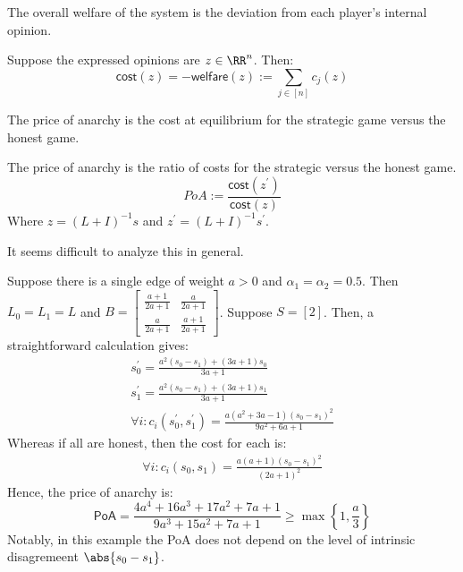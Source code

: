 The overall welfare of the system is the deviation from each player's internal opinion. 

\begin{defn}[Welfare]
Suppose the expressed opinions are $z \in \RR^{n}$. Then: 
\[
\mathsf{cost}(z) = - \mathsf{welfare}(z) := \sum\limits_{j \in [n]} c_j(z)
\]    
\end{defn}

The price of anarchy is the cost at equilibrium for the strategic game versus the honest game. 
\begin{defn}
The price of anarchy is the ratio of costs for the strategic versus the honest game. 
\[
PoA := \frac{\mathsf{cost}(z^\prime)}{\mathsf{cost}(z)}
\]    
Where $z = (L + I)^{-1} s$ and $z^\prime = (L + I)^{-1} s^\prime$. 
\end{defn}


It seems difficult to analyze this in general. 
\begin{example}
Suppose there is a single edge of weight $a > 0$ and $\alpha_1 = \alpha_2 = 0.5$. Then $L_0 = L_1 = L$ and $B = \begin{bmatrix}
\frac{a + 1}{2a + 1} & \frac{a}{2a + 1} \\
\frac{a}{2a + 1} & \frac{a + 1}{2a + 1}
\end{bmatrix}$. Suppose $S = [2]$. Then, a straightforward calculation gives: 
\begin{align*}
s_0^\prime = \frac{a^2(s_0 - s_1) + (3a + 1) s_0}{3a + 1} \\
s_1^\prime = \frac{a^2(s_0 - s_1) + (3a + 1) s_1}{3a + 1} \\
\forall i: c_i(s_0^\prime, s_1^\prime) = \frac{a(a^2 + 3a - 1)(s_0 - s_1)^2}{9a^2 + 6a + 1}
\end{align*}
Whereas if all are honest, then the cost for each is: 
\begin{align*}
\forall i: c_i(s_0, s_1) = \frac{a(a+1)(s_0 - s_1)^2}{(2a + 1)^2}    
\end{align*}
Hence, the price of anarchy is: 
\[
\mathsf{PoA} = \frac{4 a^{4} + 16 a^{3} + 17 a^{2} + 7 a + 1}{9 a^{3} + 15 a^{2} + 7 a + 1} \geq \max \left \{1, \frac{a}{3} \right \}
\]
Notably, in this example the PoA does not depend on the level of intrinsic disagremeent $\abs{s_0 - s_1}$. 
\end{example}





